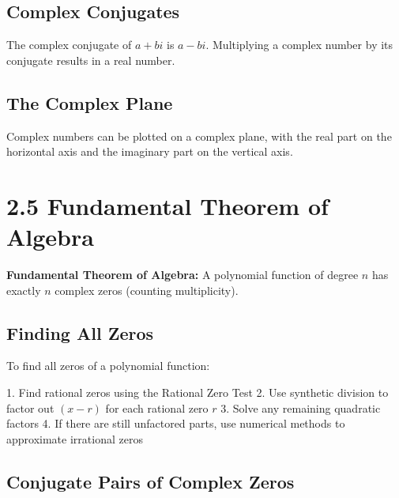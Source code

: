 \documentclass[12pt]{article}
\begin{document}
\subsection{Complex Conjugates}

The complex conjugate of $a + bi$ is $a - bi$. Multiplying a complex number by its conjugate results in a real number.

\subsection{The Complex Plane}

Complex numbers can be plotted on a complex plane, with the real part on the horizontal axis and the imaginary part on the vertical axis.

\begin{center}
\end{center}

\section{2.5 Fundamental Theorem of Algebra}

\textbf{Fundamental Theorem of Algebra:} A polynomial function of degree $n$ has exactly $n$ complex zeros (counting multiplicity).

\subsection{Finding All Zeros}

To find all zeros of a polynomial function:

1. Find rational zeros using the Rational Zero Test
2. Use synthetic division to factor out $(x - r)$ for each rational zero $r$
3. Solve any remaining quadratic factors
4. If there are still unfactored parts, use numerical methods to approximate irrational zeros

\subsection{Conjugate Pairs of Complex Zeros}
\end{document}
